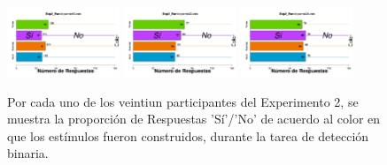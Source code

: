 \documentclass[a4paper ]{article}
\begin{document}
\begin{figure}[th]
\includegraphics[width=0.3\textwidth]{Figures/BiasColor_Exp2_P19} \includegraphics[width=0.3\textwidth]{Figures/BiasColor_Exp2_P20} \includegraphics[width=0.3\textwidth]{Figures/BiasColor_Exp2_P21} 
\caption[Proporción de Respuestas Sí/No por Color; Experimento 2]{Por cada uno de los veintiun participantes del Experimento 2, se muestra la proporción de Respuestas 'Sí'/'No' de acuerdo al color en que los estímulos fueron construidos, durante la tarea de detección binaria.}
\label{fig:BiasColor_E2}
\end{figure}
\end{document}
